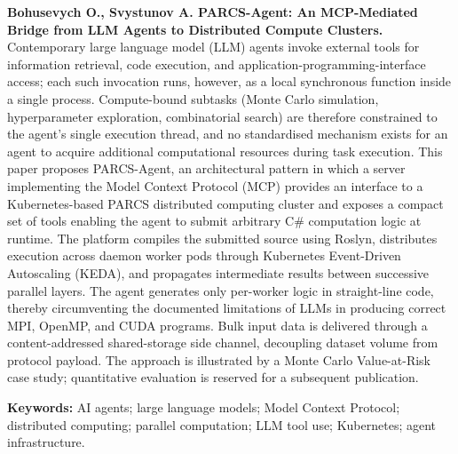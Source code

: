 
\begin{citabstract}
\noindent\textbf{Bohusevych O., Svystunov A. PARCS-Agent: An MCP-Mediated Bridge from LLM Agents to Distributed Compute Clusters.}
Contemporary large language model (LLM) agents invoke external tools for information retrieval, code execution, and application-programming-interface access; each such invocation runs, however, as a local synchronous function inside a single process. Compute-bound subtasks (Monte Carlo simulation, hyperparameter exploration, combinatorial search) are therefore constrained to the agent's single execution thread, and no standardised mechanism exists for an agent to acquire additional computational resources during task execution. This paper proposes PARCS-Agent, an architectural pattern in which a server implementing the Model Context Protocol (MCP) provides an interface to a Kubernetes-based PARCS distributed computing cluster and exposes a compact set of tools enabling the agent to submit arbitrary C\# computation logic at runtime. The platform compiles the submitted source using Roslyn, distributes execution across daemon worker pods through Kubernetes Event-Driven Autoscaling (KEDA), and propagates intermediate results between successive parallel layers. The agent generates only per-worker logic in straight-line code, thereby circumventing the documented limitations of LLMs in producing correct MPI, OpenMP, and CUDA programs. Bulk input data is delivered through a content-addressed shared-storage side channel, decoupling dataset volume from protocol payload. The approach is illustrated by a Monte Carlo Value-at-Risk case study; quantitative evaluation is reserved for a subsequent publication.

\medskip
\noindent\textbf{Keywords:} AI agents; large language models; Model Context Protocol;
distributed computing; parallel computation; LLM tool use; Kubernetes;
agent infrastructure.
\end{citabstract}
